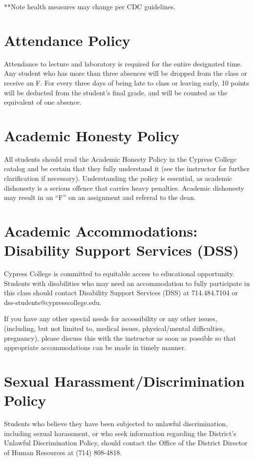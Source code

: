 \documentclass[11pt]{article}
\begin{document}
**Note health measures may change per CDC guidelines.

\section{Attendance Policy}

Attendance to lecture and laboratory is required for the entire designated time.
Any student who has more than three absences will be dropped from the class or
receive an F. For every three days of being late to class or leaving early, 10
points will be deducted from the student’s final grade, and will be counted as
the equivalent of one absence.


\section{Academic Honesty Policy}

All students should read the Academic Honesty Policy in the Cypress College catalog
and be certain that they fully understand it (see the instructor for further clarification
if necessary). Understanding the policy is essential, as academic dishonesty is a
serious offence that carries heavy penalties. Academic dishonesty may result in an
“F” on an assignment and referral to the dean.

\section{Academic Accommodations: Disability Support Services (DSS)}

Cypress College is committed to equitable access to educational opportunity.
Students with disabilities who may need an accommodation to fully participate in
this class should contact Disability Support Services (DSS) at 714.484.7104 or
dss-students@cypresscollege.edu.

If you have any other special needs for accessibility or any other issues,
(including, but not limited to, medical issues, physical/mental difficulties,
pregnancy), please discuss this with the instructor as soon as possible so that
appropriate accommodations can be made in timely manner. 

\section{Sexual Harassment/Discrimination Policy}

Students who believe they have been subjected to unlawful discrimination,
including sexual harassment, or who seek information regarding the District’s
Unlawful Discrimination Policy, should contact the Office of the District Director
of Human Resources at (714) 808-4818. 
\end{document}
